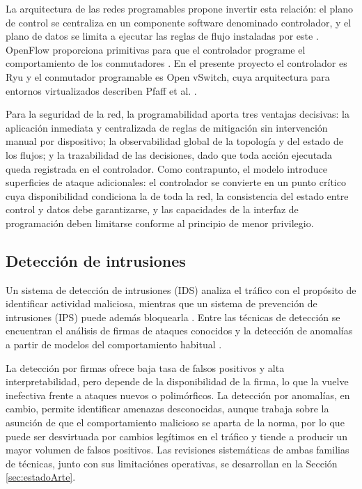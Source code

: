 La arquitectura de las redes programables propone invertir esta relaci\'on: el plano de control se centraliza en un componente software denominado controlador, y el plano de datos se limita a ejecutar las reglas de flujo instaladas por este \parencite{rfc7426}. OpenFlow proporciona primitivas para que el controlador programe el comportamiento de los conmutadores \parencite{mckeown2008openflow}. En el presente proyecto el controlador es Ryu \parencite{kubo2014ryu,ryudocs} y el conmutador programable es Open vSwitch, cuya arquitectura para entornos virtualizados describen Pfaff et al. \parencite{openvswitch2015}.

Para la seguridad de la red, la programabilidad aporta tres ventajas decisivas: la aplicaci\'on inmediata y centralizada de reglas de mitigaci\'on sin intervenci\'on manual por dispositivo; la observabilidad global de la topolog\'ia y del estado de los flujos; y la trazabilidad de las decisiones, dado que toda acci\'on ejecutada queda registrada en el controlador. Como contrapunto, el modelo introduce superficies de ataque adicionales: el controlador se convierte en un punto cr\'itico cuya disponibilidad condiciona la de toda la red, la consistencia del estado entre control y datos debe garantizarse, y las capacidades de la interfaz de programaci\'on deben limitarse conforme al principio de menor privilegio.

\subsection{Detecci\'on de intrusiones}

Un sistema de detecci\'on de intrusiones (IDS) analiza el tr\'afico con el prop\'osito de identificar actividad maliciosa, mientras que un sistema de prevenci\'on de intrusiones (IPS) puede adem\'as bloquearla \parencite{nist80094}. Entre las t\'ecnicas de detecci\'on se encuentran el an\'alisis de firmas de ataques conocidos y la detecci\'on de anomal\'ias a partir de modelos del comportamiento habitual \parencite{denning1987}.

La detecci\'on por firmas ofrece baja tasa de falsos positivos y alta interpretabilidad, pero depende de la disponibilidad de la firma, lo que la vuelve inefectiva frente a ataques nuevos o polim\'orficos. La detecci\'on por anomal\'ias, en cambio, permite identificar amenazas desconocidas, aunque trabaja sobre la asunci\'on de que el comportamiento malicioso se aparta de la norma, por lo que puede ser desvirtuada por cambios legítimos en el tr\'afico y tiende a producir un mayor volumen de falsos positivos. Las revisiones sistem\'aticas de ambas familias de t\'ecnicas, junto con sus limitaci\'ones operativas, se desarrollan en la Secci\'on \ref{sec:estadoArte}.

